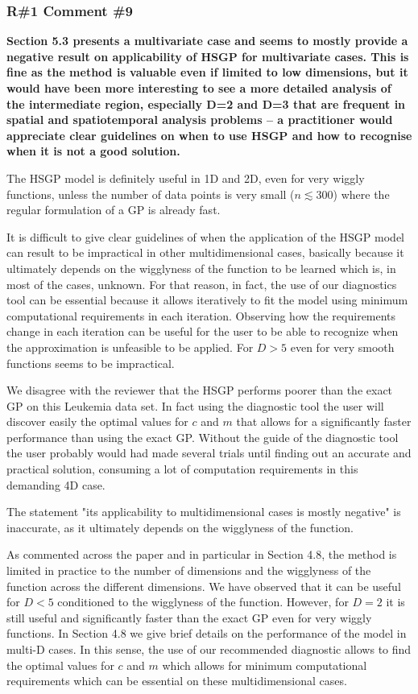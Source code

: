 \documentclass[11pt]{report}
\begin{document}
\subsubsection*{R\#1 Comment \#9}

\textbf{Section 5.3 presents a multivariate case and seems to mostly provide a negative result on applicability of HSGP for multivariate cases. This is fine as the method is valuable even if limited to low dimensions, but it would have been more interesting to see a more detailed analysis of the intermediate region, especially D=2 and D=3 that are frequent in spatial and spatiotemporal analysis problems -- a practitioner would appreciate clear guidelines on when to use HSGP and how to recognise when it is not a good solution.}

The HSGP model is definitely useful in 1D and 2D, even for very wiggly functions, unless the number of data points is very small ($n \lesssim 300$) where the regular formulation of a GP is already fast.

It is difficult to give clear guidelines of when the application of the HSGP model can result to be impractical in other multidimensional cases, basically because it ultimately depends on the wigglyness of the function to be learned which is, in most of the cases, unknown. For that reason, in fact, the use of our diagnostics tool can be essential because it allows iteratively to fit the model using minimum computational requirements in each iteration. Observing how the requirements change in each iteration can be useful for the user to be able to recognize when the approximation is unfeasible to be applied. For $D>5$ even for very smooth functions seems to be impractical.

We disagree with the reviewer that the HSGP performs poorer than the exact GP on this Leukemia data set. In fact using the diagnostic tool the user will discover easily the optimal values for $c$ and $m$ that allows for a significantly faster performance than using the exact GP. Without the guide of the diagnostic tool the user probably would had made several trials until finding out an accurate and practical solution, consuming a lot of computation requirements in this demanding 4D case.

The statement "its applicability to multidimensional cases is mostly negative" is inaccurate, as it ultimately depends on the wigglyness of the function.

As commented across the paper and in particular in Section 4.8, the method is limited in practice to the number of dimensions and the wigglyness of the function across the different dimensions. We have observed that it can be useful for $D<5$ conditioned to the wigglyness of the function. However, for $D=2$ it is still useful and significantly faster than the exact GP even for very wiggly functions. In Section 4.8 we give brief details on the performance of the model in multi-D cases. In this sense, the use of our recommended diagnostic allows to find the optimal values for $c$ and $m$ which allows for minimum computational requirements which can be essential on these multidimensional cases.
\end{document}
